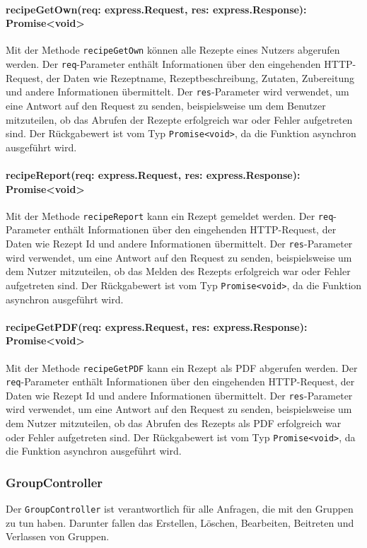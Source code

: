 \documentclass{entwurfsheft}
\begin{document}
\paragraph{recipeGetOwn(req: express.Request, res: express.Response): Promise<void>}
Mit der Methode \texttt{recipeGetOwn} können alle Rezepte eines Nutzers abgerufen werden. Der \texttt{req}-Parameter enthält Informationen über den eingehenden HTTP-Request, der Daten wie Rezeptname, Rezeptbeschreibung, Zutaten, Zubereitung und andere Informationen übermittelt. Der \texttt{res}-Parameter wird verwendet, um eine Antwort auf den Request zu senden, beispielsweise um dem Benutzer mitzuteilen, ob das Abrufen der Rezepte erfolgreich war oder Fehler aufgetreten sind.
Der Rückgabewert ist vom Typ \texttt{Promise<void>}, da die Funktion asynchron ausgeführt wird.
\paragraph{recipeReport(req: express.Request, res: express.Response): Promise<void>}
Mit der Methode \texttt{recipeReport} kann ein Rezept gemeldet werden. Der \texttt{req}-Parameter enthält Informationen über den eingehenden HTTP-Request, der Daten wie Rezept Id und andere Informationen übermittelt. Der \texttt{res}-Parameter wird verwendet, um eine Antwort auf den Request zu senden, beispielsweise um dem Nutzer mitzuteilen, ob das Melden des Rezepts erfolgreich war oder Fehler aufgetreten sind.
Der Rückgabewert ist vom Typ \texttt{Promise<void>}, da die Funktion asynchron ausgeführt wird.
\paragraph{recipeGetPDF(req: express.Request, res: express.Response): Promise<void>}
Mit der Methode \texttt{recipeGetPDF} kann ein Rezept als PDF abgerufen werden. Der \texttt{req}-Parameter enthält Informationen über den eingehenden HTTP-Request, der Daten wie Rezept Id und andere Informationen übermittelt. Der \texttt{res}-Parameter wird verwendet, um eine Antwort auf den Request zu senden, beispielsweise um dem Nutzer mitzuteilen, ob das Abrufen des Rezepts als PDF erfolgreich war oder Fehler aufgetreten sind.
Der Rückgabewert ist vom Typ \texttt{Promise<void>}, da die Funktion asynchron ausgeführt wird.


\subsubsection{GroupController}\label{sec:GroupController}
Der \texttt{GroupController} ist verantwortlich für alle Anfragen, die mit den Gruppen zu tun haben. Darunter fallen das Erstellen, Löschen, Bearbeiten, Beitreten und Verlassen von Gruppen.
\end{document}
